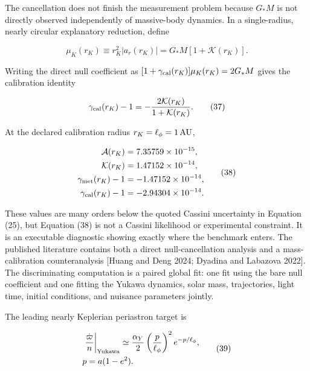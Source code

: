 \documentclass[
  american,
  11pt,
  letterpaper,
]{article}
\begin{document}
The cancellation does not finish the measurement problem because \(G_*M\) is not directly observed independently of massive-body dynamics. In a single-radius, nearly circular explanatory reduction, define

\begin{equation}
\mu_K(r_K)\equiv r_K^2|a_r(r_K)|
=G_*M[1+\mathcal K(r_K)].
\tag{36}
\end{equation}

Writing the direct null coefficient as \([1+\gamma_{\rm cal}(r_K)]\mu_K(r_K)=2G_*M\) gives the calibration identity

\begin{equation}
\gamma_{\rm cal}(r_K)-1
=-\frac{2\mathcal K(r_K)}{1+\mathcal K(r_K)}.
\tag{37}
\end{equation}

At the declared calibration radius \(r_K=\ell_\phi=1\,{\rm AU}\),

\[
\begin{aligned}
\mathcal A(r_K)&=7.35759\times10^{-15},\\
\mathcal K(r_K)&=1.47152\times10^{-14},\\
\gamma_{\rm met}(r_K)-1&=-1.47152\times10^{-14},\\
\gamma_{\rm cal}(r_K)-1&=-2.94304\times10^{-14}.
\end{aligned}
\tag{38}
\]

These values are many orders below the quoted Cassini uncertainty in Equation (25), but Equation (38) is not a Cassini likelihood or experimental constraint. It is an executable diagnostic showing exactly where the benchmark enters. The published literature contains both a direct null-cancellation analysis and a mass-calibration counteranalysis {[}Huang and Deng 2024; Dyadina and Labazova 2022{]}. The discriminating computation is a paired global fit: one fit using the bare null coefficient and one fitting the Yukawa dynamics, solar mass, trajectories, light time, initial conditions, and nuisance parameters jointly.

The leading nearly Keplerian periastron target is

\begin{equation}
\begin{aligned}
& \left.\frac{\dot\varpi}{n}\right|_{\rm Yukawa}
\simeq\frac{\alpha_Y}{2}
\left(\frac{p}{\ell_\phi}\right)^2e^{-p/\ell_\phi}, \\
& p=a(1-e^2).
\end{aligned}
\tag{39}
\end{equation}
\end{document}
